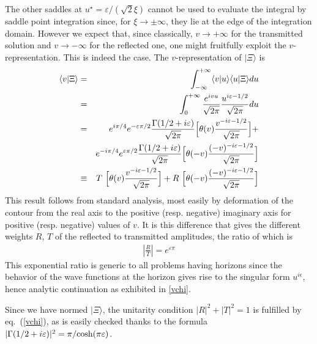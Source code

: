 \documentclass[12pt,oneside]{report}
\def\ket#1{|#1\rangle}
\begin{document}
The other saddles at $u^{\star}= \varepsilon/(\sqrt{2}\xi)$
 cannot be used to evaluate the integral by saddle point integration since, 
for $\xi \to \pm \infty $, they lie 
at the edge of the integration domain.
However we expect that, since  classically,
$v \to + \infty $ for the transmitted solution 
and $v \to - \infty $ for the reflected one,
 one
might fruitfully exploit the $v$-representation.  This is indeed the case.  The
$v$-representation of $\ket{\Xi}$ is \begin{eqnarray}
\langle v |  \Xi  \rangle & =&\int^{+\infty}_{-\infty}\langle v | u\rangle 
         \langle u | \Xi\rangle \/ du \nonumber \\
&=& \int^{+\infty}_{0}\frac {e^{ivu}}{\sqrt{2\pi}}
       \frac { u^{i \varepsilon - 1/2}}{\sqrt{2\pi}} \/du \nonumber \\
& = & e^{i\pi/4}e^{-\varepsilon\pi/2}\frac{ \Gamma(1/2+i\varepsilon)}{\sqrt{2\pi}}
\Bigl[ \theta(v) { v^{-i \varepsilon - 1/2}\over
\sqrt{2\pi}} \Bigr] \nonumber  + \\
& & e^{-i\pi/4}e^{\varepsilon\pi/2}
\frac{ \Gamma(1/2+i\varepsilon)}{\sqrt{2\pi}}
\Bigl[ \theta(-v) {(-v)^{-i \varepsilon - 1/2} \over
\sqrt{2\pi}} \Bigr]
  \nonumber \\
& \equiv &T \ \Bigl[ \theta(v) { v^{-i \varepsilon - 1/2}\over
\sqrt{2\pi}} \Bigr]
+ R \ \Bigl[ \theta(-v) {(-v)^{-i \varepsilon - 1/2} \over
\sqrt{2\pi}} \Bigr] \label{vchi}
\end{eqnarray}
This result follows from standard analysis,
most easily by deformation of the contour from the real axis to the 
 positive (resp. negative) imaginary axis
for positive (resp. negative) values of $v$. It is this
difference that
gives the different weights $R$, $T$
of the reflected to transmitted
amplitudes, 
the ratio of which is
\begin{eqnarray}
|\frac RT| = e^{\varepsilon \pi}\label{R/T}
\label{RTratio}
\end{eqnarray}
This exponential ratio is generic to all problems having horizons since the
behavior of the wave functions at the horizon gives rise to the singular form
$u^{i\epsilon}$, hence analytic continuation as exhibited in \ref{vchi}.

Since we have normed $\ket{\Xi}$, the unitarity condition $|R|^2+|T|^2=1$ is
fulfilled by eq.~(\ref{vchi}), as is easily checked thanks to
the formula $|\Gamma(1/2+i\varepsilon)|^2=\pi /
\mbox{\rm cosh}(\pi\varepsilon)$.
\end{document}
